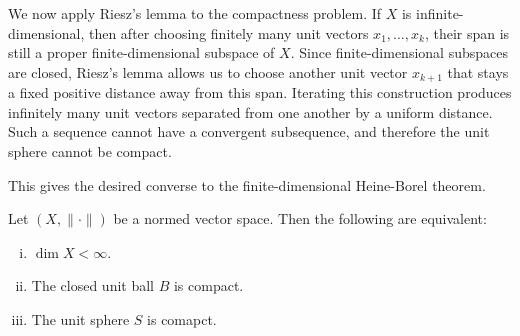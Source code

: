 We now apply Riesz's lemma to the compactness problem. If \(X\) is infinite-dimensional, then after choosing finitely many unit vectors \(x_1, \dots , x_k\), their span is still a proper finite-dimensional subspace of \(X\). Since finite-dimensional subspaces are closed, Riesz's lemma allows us to choose another unit vector \(x_{k + 1}\) that stays a fixed positive distance away from this span. Iterating this construction produces infinitely many unit vectors separated from one another by a uniform distance. Such a sequence cannot have a convergent subsequence, and therefore the unit sphere cannot be compact. 

This gives the desired converse to the finite-dimensional Heine-Borel theorem. 

\begin{theorem}
    Let \((X, \lVert \cdot \rVert )\) be a normed vector space. Then the following are equivalent:
    \begin{enumerate}[(i)]
        \item \(\dim X < \infty\). 
        \item The closed unit ball \(B\) is compact. 
        \item The unit sphere \(S\) is comapct.    
    \end{enumerate}
\end{theorem}

